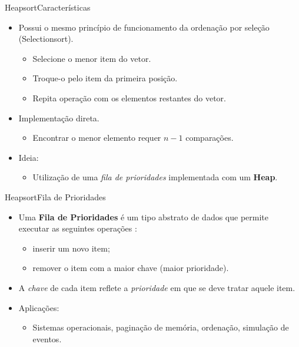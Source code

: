 \documentclass[aspectratio=169]{beamer}
\begin{document}
\begin{frame}{Heapsort}{Características}
\begin{itemize}
\item Possui o mesmo princípio de funcionamento da ordenação por seleção (Selectionsort).
\begin{itemize}
\item Selecione o menor item do vetor.
\item Troque-o pelo item da primeira posição.
\item Repita operação com os elementos restantes do vetor.
\end{itemize}
\item Implementação direta.
\begin{itemize}
\item Encontrar o menor elemento requer $n-1$ comparações.
\end{itemize}
\item Ideia:
\begin{itemize}
\item Utilização de uma {\it fila de prioridades} implementada com um {\bf Heap}.
\end{itemize}
\end{itemize}
\end{frame}



\begin{frame}{Heapsort}{Fila de Prioridades}
\begin{itemize}
\item Uma {\bf Fila de Prioridades} é um tipo abstrato de dados que permite executar as seguintes operações : 
\begin{itemize}
 \item inserir um novo item; 
 \item remover o item com a maior chave (maior prioridade).
\end{itemize}
\item A {\it chave} de cada item reflete a {\it prioridade} em que se deve tratar aquele item.
\item Aplicações:
\begin{itemize}
\item Sistemas operacionais, paginação de memória, ordenação, simulação de eventos.
\end{itemize}
\end{itemize}
\end{frame}

\end{document}

